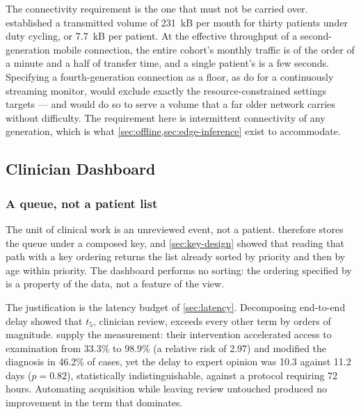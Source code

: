 \documentclass[12pt,a4paper,oneside]{report}
\begin{document}
The connectivity requirement is the one that must not be carried over.  established a transmitted volume of 231~kB per month for thirty patients under duty cycling, or 7.7~kB per patient. At the effective throughput of a second-generation mobile connection, the entire cohort's monthly traffic is of the order of a minute and a half of transfer time, and a single patient's is a few seconds. Specifying a fourth-generation connection as a floor, as \textcite{efendi2025} do for a continuously streaming monitor, would exclude exactly the resource-constrained settings \textcite{cadrage2026} targets --- and would do so to serve a volume that a far older network carries without difficulty. The requirement here is intermittent connectivity of any generation, which is what \cref{sec:offline,sec:edge-inference} exist to accommodate.

\subsection{Clinician Dashboard}\label{sec:dashboard}

\subsubsection{A queue, not a patient list}\label{sec:queue-view}

The unit of clinical work is an unreviewed event, not a patient.  therefore stores the queue under a composed key, and \cref{sec:key-design} showed that reading that path with a key ordering returns the list already sorted by priority and then by age within priority. The dashboard performs no sorting: the ordering specified by \textcite{yazdani2018} is a property of the data, not a feature of the view.

The justification is the latency budget of \cref{sec:latency}. Decomposing end-to-end delay showed that $t_5$, clinician review, exceeds every other term by orders of magnitude. \Textcite{bediang2021} supply the measurement: their intervention accelerated access to examination from 33.3\% to 98.9\% (a relative risk of 2.97) and modified the diagnosis in 46.2\% of cases, yet the delay to expert opinion was 10.3 against 11.2 days ($p = 0.82$), statistically indistinguishable, against a protocol requiring 72 hours. Automating acquisition while leaving review untouched produced no improvement in the term that dominates.
\end{document}
